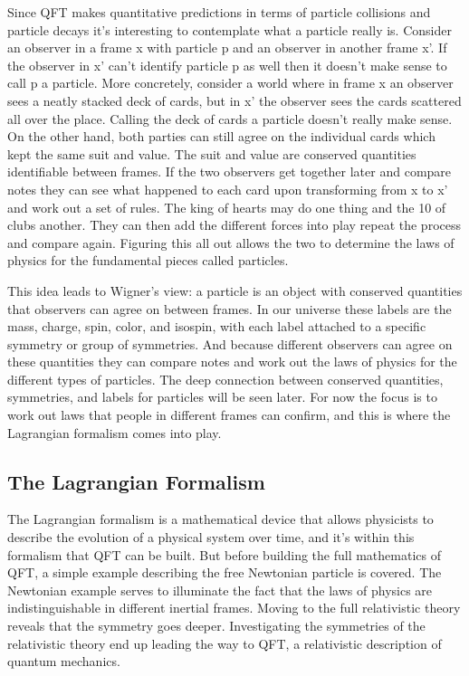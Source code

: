 Since QFT makes quantitative predictions in terms of particle collisions and particle decays it's interesting to contemplate what a particle really is. Consider an observer in a frame x with particle p and an observer in another frame x'. If the observer in x' can't identify particle p as well then it doesn't make sense to call p a particle. More concretely, consider a world where in frame x an observer sees a neatly stacked deck of cards, but in x' the observer sees the cards scattered all over the place. Calling the deck of cards a particle doesn't really make sense. On the other hand, both parties can still agree on the individual cards which kept the same suit and value. The suit and value are conserved quantities identifiable between frames. If the two observers get together later and compare notes they can see what happened to each card upon transforming from x to x' and work out a set of rules. The king of hearts may do one thing and the 10 of clubs another. They can then add the different forces into play repeat the process and compare again. Figuring this all out allows the two to determine the laws of physics for the fundamental pieces called particles.       

This idea leads to Wigner's view: a particle is an object with conserved quantities that observers can agree on between frames. In our universe these labels are the mass, charge, spin, color, and isospin, with each label attached to a specific symmetry or group of symmetries. And because different observers can agree on these quantities they can compare notes and work out the laws of physics for the different types of particles. The deep connection between conserved quantities, symmetries, and labels for particles will be seen later. For now the focus is to work out laws that people in different frames can confirm, and this is where the Lagrangian formalism comes into play. 

\subsection{The Lagrangian Formalism}

The Lagrangian formalism is a mathematical device that allows physicists to describe the evolution of a physical system over time, and it's within this formalism that QFT can be built. But before building the full mathematics of QFT, a simple example describing the free Newtonian particle is covered. The Newtonian example serves to illuminate the fact that the laws of physics are indistinguishable in different inertial frames. Moving to the full relativistic theory reveals that the symmetry goes deeper. Investigating the symmetries of the relativistic theory end up leading the way to QFT, a relativistic description of quantum mechanics.


